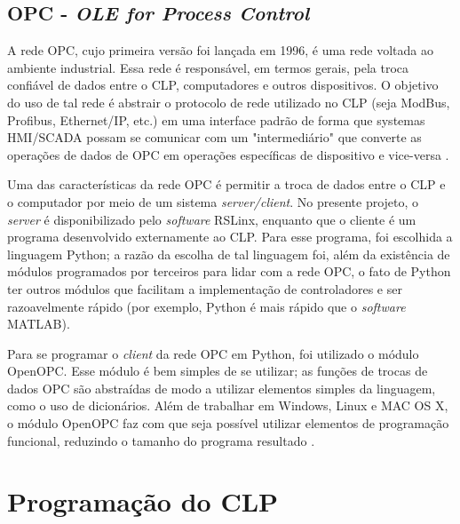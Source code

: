 \subsection{OPC - \textit{OLE for Process Control}}
A rede OPC, cujo primeira versão foi lançada em 1996, é uma rede voltada ao ambiente industrial. Essa rede é responsável, em termos gerais, pela troca confiável de dados entre o CLP, computadores e outros dispositivos. O objetivo do uso de tal rede é abstrair o protocolo de rede utilizado no CLP (seja ModBus, Profibus, Ethernet/IP, etc.) em uma interface padrão de forma que systemas HMI/SCADA possam se comunicar com um "intermediário" que converte as operações de dados de OPC em operações específicas de dispositivo e vice-versa \cite{OPCFoundation1}. 

Uma das características da rede OPC é permitir a troca de dados entre o CLP e o computador por meio de um sistema \textit{server/client}. No presente projeto, o \textit{server} é disponibilizado pelo \textit{software} RSLinx, enquanto que o cliente é um programa desenvolvido externamente ao CLP. Para esse programa, foi escolhida a linguagem Python; a razão da escolha de tal linguagem foi, além da existência de módulos programados por terceiros para lidar com a rede OPC, o fato de Python ter outros módulos que facilitam a implementação de controladores e ser razoavelmente rápido (por exemplo, Python é mais rápido que o \textit{software} MATLAB).

Para se programar o \textit{client} da rede OPC em Python, foi utilizado o módulo OpenOPC. Esse módulo é bem simples de se utilizar; as funções de trocas de dados OPC são abstraídas de modo a utilizar elementos simples da linguagem, como o uso de dicionários. Além de trabalhar em Windows, Linux e MAC OS X, o módulo OpenOPC faz com que seja possível utilizar elementos de programação funcional, reduzindo o tamanho do programa resultado \cite{OpenOPC}.


\section{Programação do CLP}
